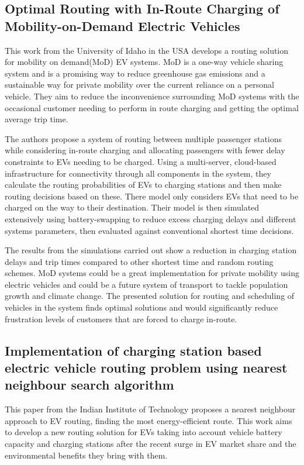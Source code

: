 \documentclass[11pt]{report}
\begin{document}
\subsection{Optimal Routing with In-Route Charging of Mobility-on-Demand Electric Vehicles  \autocite{inRouteOptimalAmmous}}

This work from the University of Idaho in the USA develops a routing solution for mobility on demand(MoD) EV systems. MoD is a one-way vehicle sharing system and is a promising way to reduce greenhouse gas emissions and a sustainable way for private mobility over the current reliance on a personal vehicle. They aim to reduce the inconvenience surrounding MoD systems with the occasional customer needing to perform in route charging and getting the optimal average trip time.

The authors propose a system of routing between multiple passenger stations while considering in-route charging and allocating passengers with fewer delay constraints to EVs needing to be charged. Using a multi-server, cloud-based infrastructure for connectivity through all components in the system, they calculate the routing probabilities of EVs to charging stations and then make routing decisions based on these. There model only considers EVs that need to be charged on the way to their destination. Their model is then simulated extensively using battery-swapping to reduce excess charging delays and different systems parameters, then evaluated against conventional shortest time decisions.

The results from the simulations carried out show a reduction in charging station delays and trip times compared to other shortest time and random routing schemes. MoD systems could be a great implementation for private mobility using electric vehicles and could be a future system of transport to tackle population growth and climate change. The presented solution for routing and scheduling of vehicles in the system finds optimal solutions and would significantly reduce frustration levels of customers that are forced to charge in-route.

\subsection{Implementation of charging station based electric vehicle routing problem using nearest neighbour search algorithm  \autocite{csNearestNeighbourDaanish}}

This paper from the Indian Institute of Technology proposes a nearest neighbour approach to EV routing, finding the most energy-efficient route. This work aims to develop a new routing solution for EVs taking into account vehicle battery capacity and charging stations after the recent surge in EV market share and the environmental benefits they bring with them.
\end{document}

